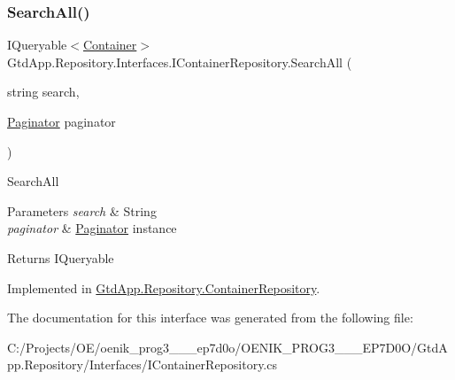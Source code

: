 \subsubsection{\texorpdfstring{Search\+All()}{SearchAll()}}
{\footnotesize\ttfamily I\+Queryable$<$\mbox{\hyperlink{class_gtd_app_1_1_data_1_1_container}{Container}}$>$ Gtd\+App.\+Repository.\+Interfaces.\+I\+Container\+Repository.\+Search\+All (\begin{DoxyParamCaption}\item[{string}]{search,  }\item[{\mbox{\hyperlink{class_gtd_app_1_1_repository_1_1_paginator}{Paginator}}}]{paginator }\end{DoxyParamCaption})}



Search\+All 


\begin{DoxyParams}{Parameters}
{\em search} & String\\
\hline
{\em paginator} & \mbox{\hyperlink{class_gtd_app_1_1_repository_1_1_paginator}{Paginator}} instance\\
\hline
\end{DoxyParams}
\begin{DoxyReturn}{Returns}
I\+Queryable
\end{DoxyReturn}


Implemented in \mbox{\hyperlink{class_gtd_app_1_1_repository_1_1_container_repository_a8bb337e076498a56737c6c6874fe5b98}{Gtd\+App.\+Repository.\+Container\+Repository}}.



The documentation for this interface was generated from the following file\+:\begin{DoxyCompactItemize}
\item 
C\+:/\+Projects/\+O\+E/oenik\+\_\+prog3\+\_\+\_\+\_\+ep7d0o/\+O\+E\+N\+I\+K\+\_\+\+P\+R\+O\+G3\+\_\+\_\+\_\+\+E\+P7\+D0\+O/\+Gtd\+App.\+Repository/\+Interfaces/I\+Container\+Repository.\+cs\end{DoxyCompactItemize}
